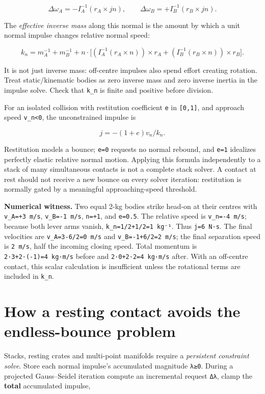 \[
\Delta\omega_A=-I_A^{-1}(r_A\times jn),\qquad
\Delta\omega_B=+I_B^{-1}(r_B\times jn).
\]

The \emph{effective inverse mass} along this normal is the amount by which a unit normal impulse changes relative normal speed:

\[
k_n=m_A^{-1}+m_B^{-1}
+n\cdot\Big[
(I_A^{-1}(r_A\times n))\times r_A
+(I_B^{-1}(r_B\times n))\times r_B
\Big].
\]

It is not just inverse mass: off-centre impulses also spend effort creating rotation. Treat static/kinematic bodies as zero inverse mass and zero inverse inertia in the impulse solve. Check that \texttt{k\_n} is finite and positive before division.

For an isolated collision with restitution coefficient \texttt{e} in \texttt{{[}0,1{]}}, and approach speed \texttt{v\_n\textless{}0}, the unconstrained impulse is

\[
j=-(1+e)v_n/k_n.
\]

Restitution models a bounce; \texttt{e=0} requests no normal rebound, and \texttt{e=1} idealizes perfectly elastic relative normal motion. Applying this formula independently to a stack of many simultaneous contacts is not a complete stack solver. A contact at rest should not receive a new bounce on every solver iteration: restitution is normally gated by a meaningful approaching-speed threshold.

\textbf{Numerical witness.} Two equal 2-kg bodies strike head-on at their centres with \texttt{v\_A=+3\ m/s}, \texttt{v\_B=-1\ m/s}, \texttt{n=+1}, and \texttt{e=0.5}. The relative speed is \texttt{v\_n=-4\ m/s}; because both lever arms vanish, \texttt{k\_n=1/2+1/2=1\ kg⁻¹}. Thus \texttt{j=6\ N·s}. The final velocities are \texttt{v\textquotesingle{}\_A=3-6/2=0\ m/s} and \texttt{v\textquotesingle{}\_B=-1+6/2=2\ m/s}; the final separation speed is \texttt{2\ m/s}, half the incoming closing speed. Total momentum is \texttt{2·3+2·(-1)=4\ kg·m/s} before and \texttt{2·0+2·2=4\ kg·m/s} after. With an off-centre contact, this scalar calculation is insufficient unless the rotational terms are included in \texttt{k\_n}.

\section{How a resting contact avoids the endless-bounce problem}\label{02-foundations-ii-ch039-how-a-resting-contact-avoids-the-endless-bounce-problem}

Stacks, resting crates and multi-point manifolds require a \emph{persistent constraint solve}. Store each normal impulse's accumulated magnitude \texttt{λ≥0}. During a projected Gauss--Seidel iteration compute an incremental request \texttt{Δλ}, clamp the \textbf{total} accumulated impulse,

